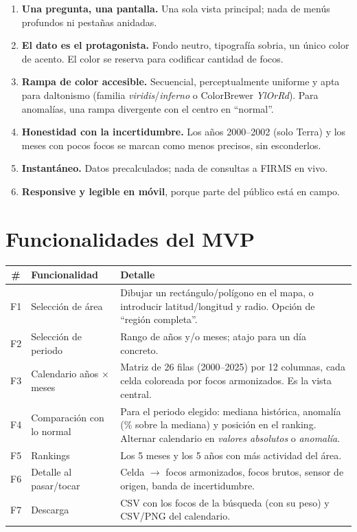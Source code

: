 \documentclass[11pt,a4paper]{article}
\begin{document}
\begin{enumerate}
  \item \textbf{Una pregunta, una pantalla.} Una sola vista principal; nada de menús
        profundos ni pestañas anidadas.
  \item \textbf{El dato es el protagonista.} Fondo neutro, tipografía sobria, un único
        color de acento. El color se reserva para codificar cantidad de focos.
  \item \textbf{Rampa de color accesible.} Secuencial, perceptualmente uniforme y apta
        para daltonismo (familia \emph{viridis}/\emph{inferno} o ColorBrewer \emph{YlOrRd}).
        Para anomalías, una rampa divergente con el centro en ``normal''.
  \item \textbf{Honestidad con la incertidumbre.} Los años 2000--2002 (solo Terra) y
        los meses con pocos focos se marcan como menos precisos, sin esconderlos.
  \item \textbf{Instantáneo.} Datos precalculados; nada de consultas a FIRMS en vivo.
  \item \textbf{Responsive y legible en móvil}, porque parte del público está en campo.
\end{enumerate}

\section{Funcionalidades del MVP}

\begin{tabularx}{\linewidth}{@{}clX@{}}
\toprule
\# & Funcionalidad & Detalle \\
\midrule
F1 & Selección de área & Dibujar un rectángulo/polígono en el mapa, o introducir
     latitud/longitud y radio. Opción de ``región completa''. \\
F2 & Selección de periodo & Rango de años y/o meses; atajo para un día concreto. \\
F3 & Calendario años $\times$ meses & Matriz de 26 filas (2000--2025) por 12 columnas,
     cada celda coloreada por focos armonizados. Es la vista central. \\
F4 & Comparación con lo normal & Para el periodo elegido: mediana histórica, anomalía
     (\% sobre la mediana) y posición en el ranking. Alternar calendario en
     \emph{valores absolutos} o \emph{anomalía}. \\
F5 & Rankings & Los 5 meses y los 5 años con más actividad del área. \\
F6 & Detalle al pasar/tocar & Celda $\to$ focos armonizados, focos brutos, sensor de
     origen, banda de incertidumbre. \\
F7 & Descarga & CSV con los focos de la búsqueda (con su peso) y CSV/PNG del calendario. \\
\bottomrule
\end{tabularx}
\end{document}
